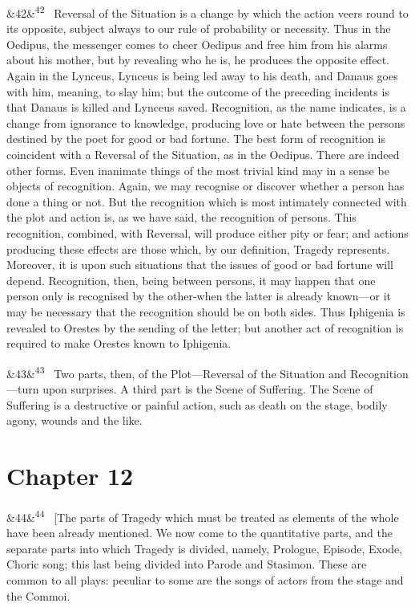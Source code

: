 \documentclass[12pt]{article}
\newcommand{\para}[1][]{\par\noindent\ifx&#1&\else\textsuperscript{\footnotesize #1}~\fi}
\begin{document}
\para[42] Reversal of the Situation is a change by which the action veers round to its opposite, subject always to our rule of probability or necessity. Thus in the Oedipus, the messenger comes to cheer Oedipus and free him from his alarms about his mother, but by revealing who he is, he produces the opposite effect. Again in the Lynceus, Lynceus is being led away to his death, and Danaus goes with him, meaning, to slay him; but the outcome of the preceding incidents is that Danaus is killed and Lynceus saved. Recognition, as the name indicates, is a change from ignorance to knowledge, producing love or hate between the persons destined by the poet for good or bad fortune. The best form of recognition is coincident with a Reversal of the Situation, as in the Oedipus. There are indeed other forms. Even inanimate things of the most trivial kind may in a sense be objects of recognition. Again, we may recognise or discover whether a person has done a thing or not. But the recognition which is most intimately connected with the plot and action is, as we have said, the recognition of persons. This recognition, combined, with Reversal, will produce either pity or fear; and actions producing these effects are those which, by our definition, Tragedy represents. Moreover, it is upon such situations that the issues of good or bad fortune will depend. Recognition, then, being between persons, it may happen that one person only is recognised by the other-when the latter is already known---or it may be necessary that the recognition should be on both sides. Thus Iphigenia is revealed to Orestes by the sending of the letter; but another act of recognition is required to make Orestes known to Iphigenia.

\para[43] Two parts, then, of the Plot---Reversal of the Situation and Recognition---turn upon surprises. A third part is the Scene of Suffering. The Scene of Suffering is a destructive or painful action, such as death on the stage, bodily agony, wounds and the like.

\section*{Chapter 12}

\para[44] [The parts of Tragedy which must be treated as elements of the whole have been already mentioned. We now come to the quantitative parts, and the separate parts into which Tragedy is divided, namely, Prologue, Episode, Exode, Choric song; this last being divided into Parode and Stasimon. These are common to all plays: peculiar to some are the songs of actors from the stage and the Commoi.
\end{document}
